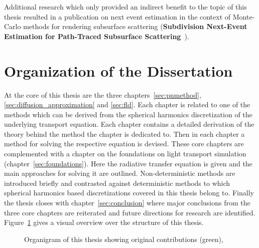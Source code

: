 Additional research which only provided an indirect benefit to the topic of this thesis resulted in a publication on next event estimation in the context of Monte-Carlo methods for rendering subsurface scattering (\textbf{Subdivision Next-Event Estimation for Path-Traced Subsurface Scattering}~\cite{Koerner16}).

\section{Organization of the Dissertation}

At the core of this thesis are the three chapters~\ref{sec:pnmethod}, \ref{sec:diffusion_approximation} and \ref{sec:fld}. Each chapter is related to one of the methods which can be derived from the spherical harmonics discretization of the underlying transport equation. Each chapter contains a detailed derivation of the theory behind the method the chapter is dedicated to. Then in each chapter a method for solving the respective equation is devised. These core chapters are complemented with a chapter on the foundations on light transport simulation (chapter~\ref{sec:foundations}). Here the radiative transfer equation is given and the main approaches for solving it are outlined. Non-deterministic methods are introduced briefly and contrasted against deterministic methods to which spherical harmonics based discretizations covered in this thesis belong to. Finally the thesis closes with chapter~\ref{sec:conclusion} where major conclusions from the three core chapters are reiterated and future directions for research are identified. Figure~\ref{fig:intro_organization} gives a visual overview over the structure of this thesis.
\begin{figure}[ht]
\centering
{}
\caption{Organigram of this thesis showing original contributions (green), }
\label{fig:intro_organization}
\end{figure}








